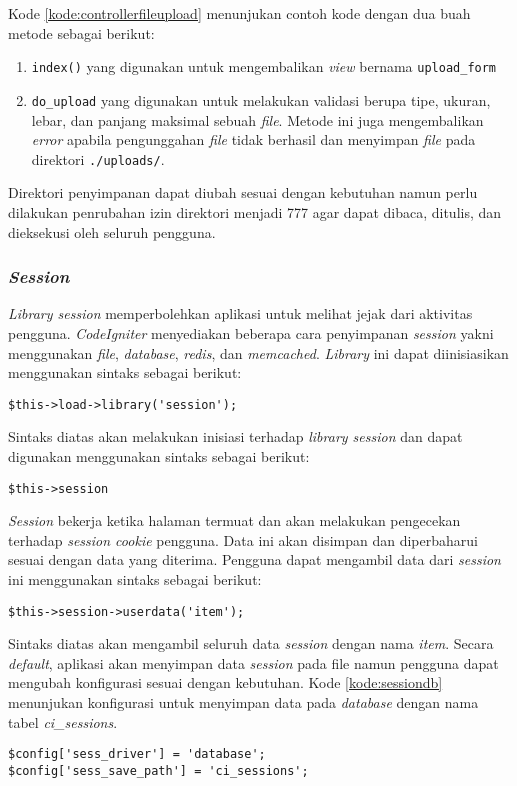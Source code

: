 Kode \ref{kode:controllerfileupload} menunjukan contoh kode dengan dua buah metode sebagai berikut:
\begin{enumerate}
\item \verb|index()| yang digunakan untuk mengembalikan \textit{view} bernama \texttt{upload\_form}
\item \verb|do_upload| yang digunakan untuk melakukan validasi berupa tipe, ukuran, lebar, dan panjang maksimal sebuah \textit{file}. Metode ini juga mengembalikan \textit{error} apabila pengunggahan \textit{file} tidak berhasil dan menyimpan \textit{file} pada direktori \texttt{./uploads/}.
\end{enumerate}
Direktori penyimpanan dapat diubah sesuai dengan kebutuhan namun perlu dilakukan penrubahan izin direktori menjadi 777 agar dapat dibaca, ditulis, dan dieksekusi oleh seluruh pengguna.

\subsubsection{\textit{Session}}
\textit{Library session} memperbolehkan aplikasi untuk melihat jejak dari aktivitas pengguna. \textit{CodeIgniter} menyediakan beberapa cara penyimpanan \textit{session} yakni menggunakan \textit{file}, \textit{database}, \textit{redis}, dan \textit{memcached}. \textit{Library} ini dapat diinisiasikan menggunakan sintaks sebagai berikut:
\begin{center}
	\verb|$this->load->library('session');|
\end{center}
Sintaks diatas akan melakukan inisiasi terhadap \textit{library session} dan dapat digunakan menggunakan sintaks sebagai berikut:
\begin{center}
	\verb|$this->session|
\end{center}
\textit{Session} bekerja ketika halaman termuat dan akan melakukan pengecekan terhadap \textit{session cookie} pengguna. Data ini akan disimpan dan diperbaharui sesuai dengan  data yang diterima. Pengguna dapat mengambil data dari \textit{session} ini menggunakan sintaks sebagai berikut:
\begin{center}
	\verb|$this->session->userdata('item');|
\end{center}
Sintaks diatas akan mengambil seluruh data \textit{session} dengan nama \textit{item}. Secara \textit{default}, aplikasi akan menyimpan data \textit{session} pada file namun pengguna dapat mengubah konfigurasi sesuai dengan kebutuhan. Kode \ref{kode:sessiondb} menunjukan konfigurasi untuk menyimpan data pada \textit{database} dengan nama tabel \textit{ci\_sessions}.
\begin{lstlisting}[caption=Contoh konfigurasi untuk menyimpan data pada \textit{database}, label=kode:sessiondb]
$config['sess_driver'] = 'database';
$config['sess_save_path'] = 'ci_sessions';
\end{lstlisting}

